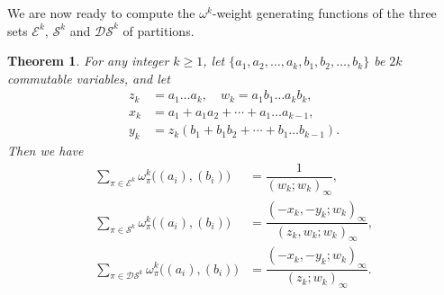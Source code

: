 \documentclass[12pt]{amsart}
\numberwithin{equation}{section}
\theoremstyle{plain}
\newtheorem{theorem}{Theorem}[section]
\theoremstyle{definition}
\begin{document}
We are now ready to compute the $\omega^k$-weight generating functions of the three sets $ \mathcal{E}^k$,
$\mathcal{S}^k$ and $\mathcal{DS}^k$ of partitions.
\begin{theorem}\label{main1}
For any integer $k\geq 1$, let $\{a_1,a_2,\ldots,a_k,b_1,b_2,\ldots,b_k\}$ be $2k$ commutable variables, and let
\begin{align*}

z_k &=a_1\ldots a_k, \quad w_k=a_1b_1\ldots a_kb_k,\\
x_k &=a_1+a_1a_2+\cdots+a_1\ldots a_{k-1},\\
y_k &=z_k(b_1+b_1b_2+\cdots+b_1\ldots b_{k-1}). 
\end{align*}
Then we have
\begin{align}
\sum\limits_{\pi\in \mathcal{E}^k}\omega_{\pi}^{k}\big((a_i), (b_i)\big) &=\dfrac{1}{(w_k;w_k)_{\infty}},\label{gfEk}\\
\sum\limits_{\pi\in\mathcal{S}^k}\omega_{\pi}^{k}\big((a_i), (b_i)\big) 
&=\dfrac{(-x_k,-y_k;w_k)_{\infty}}{(z_k,w_k;w_k)_{\infty}},\label{gfSk}\\
\sum\limits_{\pi\in\mathcal{DS}^k}\omega_{\pi}^{k}\big((a_i), (b_i)\big) &=\dfrac{(-x_k,-y_k;w_k)_{\infty}}{(z_k;w_k)_{\infty}}.\label{gfDSk}
\end{align}
\end{theorem}
\end{document}

